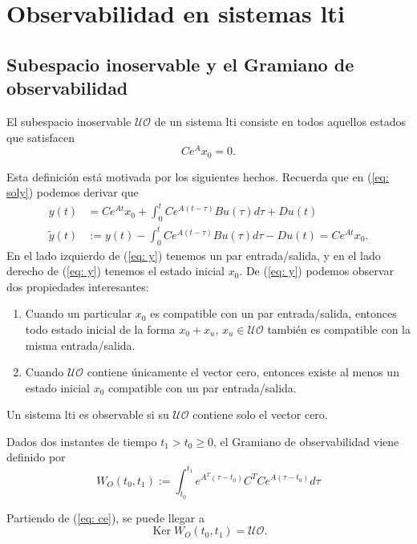 \section{Observabilidad en sistemas lti}
\subsection{Subespacio inoservable y el Gramiano de observabilidad}
\begin{definition}
	El subespacio inoservable $\mathcal{UO}$ de un sistema lti consiste en todos aquellos estados que satisfacen
	\begin{equation}
	C e^{A} x_0 = 0.
		\label{eq: ce}
	\end{equation}
\end{definition}
Esta definición está motivada por los siguientes hechos.
Recuerda que en (\ref{eq: soly}) podemos derivar que
\begin{align}
	y(t) &= Ce^{At}x_0 + \int_0^tCe^{A(t-\tau)}Bu(\tau)d\tau + Du(t) \nonumber \\
	\tilde y(t) &:= y(t) - \int_0^tCe^{A(t-\tau)}Bu(\tau)d\tau - Du(t) = Ce^{At}x_0. \label{eq: y}
\end{align}
En el lado izquierdo de (\ref{eq: y}) tenemos un par entrada/salida, y en el lado derecho de (\ref{eq: y}) tenemos el estado inicial $x_0$. De (\ref{eq: y}) podemos observar dos propiedades interesantes:
\begin{enumerate}
	\item Cuando un particular $x_0$ es compatible con un par entrada/salida, entonces todo estado inicial de la forma $x_0 + x_u, \, x_u\in\mathcal{UO}$ también es compatible con la misma entrada/salida.
	\item Cuando $\mathcal{UO}$ contiene únicamente el vector cero, entonces existe al menos un estado inicial $x_0$ compatible con un par entrada/salida.
\end{enumerate}

\begin{definition}
	Un sistema lti es observable si su $\mathcal{UO}$ contiene solo el vector cero.
\end{definition}

\begin{definition}
	Dados dos instantes de tiempo $t_1>t_0\geq 0$, el Gramiano de observabilidad viene definido por
	\begin{equation}
		W_O(t_0,t_1) := \int_{t_0}^{t_1}e^{A^T(\tau - t_0)} C^T Ce^{A(\tau - t_0)}d\tau
	\end{equation}
\end{definition}
Partiendo de (\ref{eq: ce}), se puede llegar a
\begin{equation}
	\operatorname{Ker}W_O(t_0,t_1) = \mathcal{UO}.
\end{equation}

